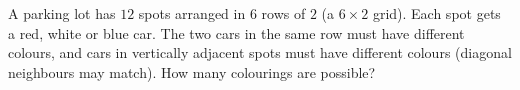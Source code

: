 A parking lot has $12$ spots arranged in $6$ rows of $2$ (a $6\times2$ grid). Each spot gets a red, white or blue car. The two cars in the same row must have different colours, and cars in vertically adjacent spots must have different colours (diagonal neighbours may match). How many colourings are possible?
